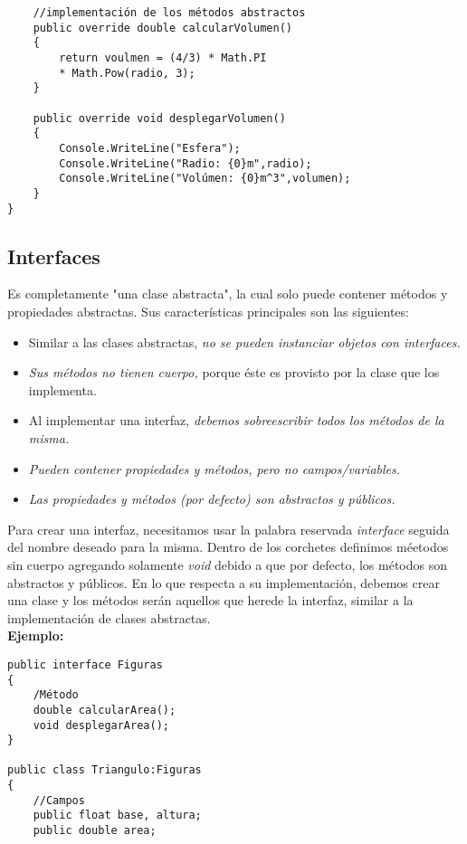 \documentclass[letterpaper, 12pt]{article}
\begin{document}
\begin{justify}
\begin{verbatim}
    //implementación de los métodos abstractos
    public override double calcularVolumen()
    {
        return voulmen = (4/3) * Math.PI
        * Math.Pow(radio, 3);
    }

    public override void desplegarVolumen()
    {
        Console.WriteLine("Esfera");
        Console.WriteLine("Radio: {0}m",radio);
        Console.WriteLine("Volúmen: {0}m^3",volumen);
    }
}
            \end{verbatim}
        \subsection{Interfaces}
        Es completamente "una clase abstracta", la cual solo puede contener métodos y propiedades abstractas. 
        Sus características principales son las siguientes:
        \begin{itemize}
            \item Similar a las clases abstractas, \emph{no se pueden instanciar objetos con interfaces.}
            \item \emph{Sus métodos no tienen cuerpo,} porque éste es provisto por la clase que los implementa.
            \item Al implementar una interfaz, \emph{debemos sobreescribir todos los métodos de la misma.}
            \item \emph{Pueden contener propiedades y métodos, pero no campos/variables.}
            \item \emph{Las propiedades y métodos (por defecto) son abstractos y públicos.}
        \end{itemize}
        Para crear una interfaz, necesitamos usar la palabra reservada \emph{interface} seguida del nombre deseado para la misma. Dentro de los corchetes
        definimos méetodos sin cuerpo agregando solamente \emph{void }debido a que por defecto, los métodos son abstractos y públicos. En lo que respecta
        a su implementación, debemos crear una clase y los métodos serán aquellos que herede la interfaz, similar a la implementación de clases abstractas.
        \newline
        \textbf{\\Ejemplo:}
            \begin{verbatim}
public interface Figuras
{
    /Método
    double calcularArea();
    void desplegarArea();
}

public class Triangulo:Figuras
{
    //Campos
    public float base, altura;
    public double area;


\end{verbatim}
\end{justify}
\end{document}
